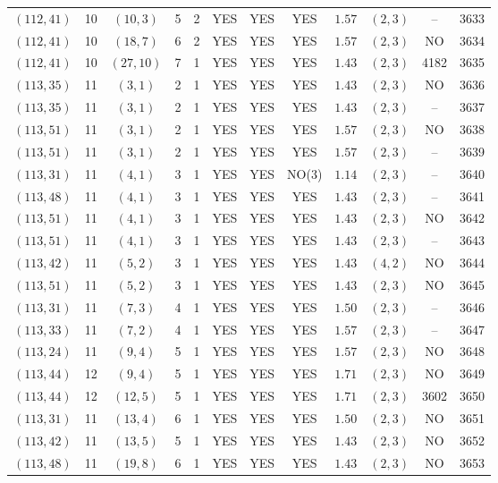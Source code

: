 \begin{longtable}{|c|c|c|c|c|c|c|c|c|c|c|c|}
$(112,41)$ & 10 & $(10,3)$ & 5 & 2 & YES & YES & YES & $1.57$ & $(2,3)$ & -- & 3633\\
$(112,41)$ & 10 & $(18,7)$ & 6 & 2 & YES & YES & YES & $1.57$ & $(2,3)$ & NO & 3634\\
$(112,41)$ & 10 & $(27,10)$ & 7 & 1 & YES & YES & YES & $1.43$ & $(2,3)$ & 4182 & 3635\\
$(113,35)$ & 11 & $(3,1)$ & 2 & 1 & YES & YES & YES & $1.43$ & $(2,3)$ & NO & 3636\\
$(113,35)$ & 11 & $(3,1)$ & 2 & 1 & YES & YES & YES & $1.43$ & $(2,3)$ & -- & 3637\\
$(113,51)$ & 11 & $(3,1)$ & 2 & 1 & YES & YES & YES & $1.57$ & $(2,3)$ & NO & 3638\\
$(113,51)$ & 11 & $(3,1)$ & 2 & 1 & YES & YES & YES & $1.57$ & $(2,3)$ & -- & 3639\\
$(113,31)$ & 11 & $(4,1)$ & 3 & 1 & YES & YES & NO(3) & $1.14$ & $(2,3)$ & -- & 3640\\
$(113,48)$ & 11 & $(4,1)$ & 3 & 1 & YES & YES & YES & $1.43$ & $(2,3)$ & -- & 3641\\
$(113,51)$ & 11 & $(4,1)$ & 3 & 1 & YES & YES & YES & $1.43$ & $(2,3)$ & NO & 3642\\
$(113,51)$ & 11 & $(4,1)$ & 3 & 1 & YES & YES & YES & $1.43$ & $(2,3)$ & -- & 3643\\
$(113,42)$ & 11 & $(5,2)$ & 3 & 1 & YES & YES & YES & $1.43$ & $(4,2)$ & NO & 3644\\
$(113,51)$ & 11 & $(5,2)$ & 3 & 1 & YES & YES & YES & $1.43$ & $(2,3)$ & NO & 3645\\
$(113,31)$ & 11 & $(7,3)$ & 4 & 1 & YES & YES & YES & $1.50$ & $(2,3)$ & -- & 3646\\
$(113,33)$ & 11 & $(7,2)$ & 4 & 1 & YES & YES & YES & $1.57$ & $(2,3)$ & -- & 3647\\
$(113,24)$ & 11 & $(9,4)$ & 5 & 1 & YES & YES & YES & $1.57$ & $(2,3)$ & NO & 3648\\
$(113,44)$ & 12 & $(9,4)$ & 5 & 1 & YES & YES & YES & $1.71$ & $(2,3)$ & NO & 3649\\
$(113,44)$ & 12 & $(12,5)$ & 5 & 1 & YES & YES & YES & $1.71$ & $(2,3)$ & 3602 & 3650\\
$(113,31)$ & 11 & $(13,4)$ & 6 & 1 & YES & YES & YES & $1.50$ & $(2,3)$ & NO & 3651\\
$(113,42)$ & 11 & $(13,5)$ & 5 & 1 & YES & YES & YES & $1.43$ & $(2,3)$ & NO & 3652\\
$(113,48)$ & 11 & $(19,8)$ & 6 & 1 & YES & YES & YES & $1.43$ & $(2,3)$ & NO & 3653\\

\end{longtable}
